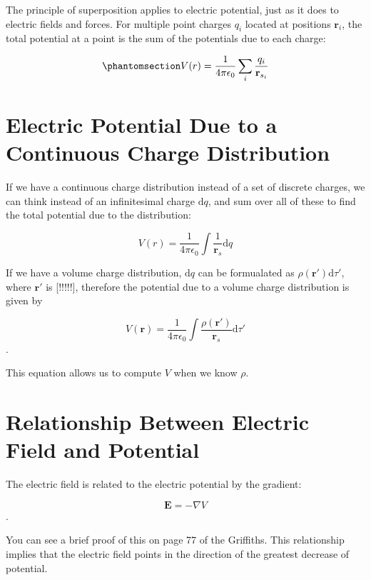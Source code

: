 \documentclass[
  letterpaper,
  DIV=11,
  numbers=noendperiod]{scrreprt}
\begin{document}
The principle of superposition applies to electric potential, just as it
does to electric fields and forces. For multiple point charges \(q_i\)
located at positions \(\mathrm{\mathbf{r}}_i\), the total potential at a
point is the sum of the potentials due to each
charge:

\begin{equation}\phantomsection\label{eq-Vmulti}{ V(r) = \frac{1}{4\pi \epsilon_0} \sum_{i} \frac{q_i}{\mathrm{\mathbf{r}}_{s_i}} }\end{equation}

\section{Electric Potential Due to a Continuous Charge
Distribution}\label{electric-potential-due-to-a-continuous-charge-distribution}

If we have a continuous charge distribution instead of a set of discrete
charges, we can think instead of an infinitesimal charge
\(\mathrm{d}q\), and sum over all of these to find the total potential
due to the distribution:

\[ V(r) = \frac{1}{4\pi \epsilon_0} \int \frac{1}{\mathrm{\mathbf{r}}_s} \mathrm{d}q \]

If we have a volume charge distribution, \(\mathrm{d}q\) can be
formualated as \(\rho(\mathrm{\mathbf{r}}') \mathrm{d}\tau'\), where
\(\mathrm{\mathbf{r}}'\) is {[}!!!!!{]}, therefore the potential due to
a volume charge distribution is given by

\[ V(\mathrm{\mathbf{r}}) = \frac{1}{4\pi \epsilon_0} \int \frac{\rho(\mathrm{\mathbf{r}}')}{\mathrm{\mathbf{r}}_s} \mathrm{d} \tau' \].

This equation allows us to compute \(V\) when we know \(\rho\).

\section{Relationship Between Electric Field and
Potential}\label{relationship-between-electric-field-and-potential}

The electric field is related to the electric potential by the gradient:

\[ \mathrm{\mathbf{E}}= -\nabla V \].

You can see a brief proof of this on page 77 of the Griffiths. This
relationship implies that the electric field points in the direction of
the greatest decrease of potential.
\end{document}
